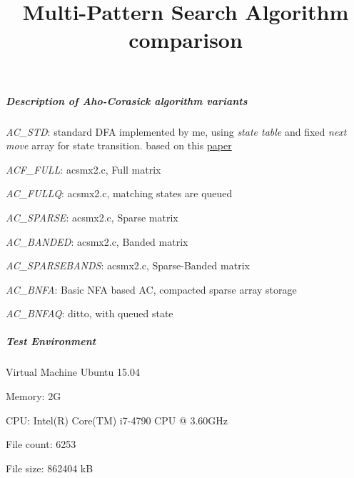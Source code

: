 \documentclass[a4paper]{article}
\begin{document}
\title{Multi-Pattern Search Algorithm comparison}
\author{}
\maketitle

\subparagraph{Description of Aho-Corasick algorithm variants}

\begin{list}{}{}
\item \emph{ AC\_STD}: standard DFA implemented by me, using \textit{state table} and fixed \textit{next move} array for state transition. based on this \hyperlink{effic}{paper}
\item \emph{ ACF\_FULL}: acsmx2.c, Full matrix
\item \emph{ AC\_FULLQ}: acsmx2.c, matching states are queued
\item \emph{ AC\_SPARSE}: acsmx2.c, Sparse matrix
\item \emph{ AC\_BANDED}: acsmx2.c, Banded matrix
\item \emph{ AC\_SPARSEBANDS}: acsmx2.c, Sparse-Banded matrix
\item \emph{ AC\_BNFA}: Basic NFA based AC, compacted sparse array storage
\item \emph{ AC\_BNFAQ}: ditto, with queued state
\end{list}


\subparagraph{Test Environment}

 \begin{list}{}{}
 \item  Virtual Machine Ubuntu 15.04
 \item  Memory: 2G
 \item  CPU: Intel(R) Core(TM) i7-4790 CPU @ 3.60GHz
 \item  File count: 6253
 \item  File size: 862404 kB
 \end{list}
\end{document}
